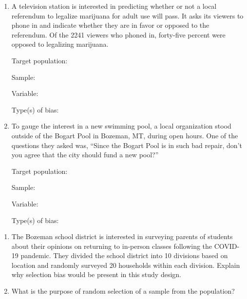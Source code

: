 \documentclass[
]{report}
\begin{document}
\newpage

\begin{enumerate}
\def\labelenumi{\arabic{enumi}.}
\setcounter{enumi}{2}
\item
  A television station is interested in predicting whether or not a local referendum to legalize marijuana for adult use will pass. It asks its viewers to phone in and indicate whether they are in favor or opposed to the referendum. Of the 2241 viewers who phoned in, forty-five percent were opposed to legalizing marijuana.
  \vspace{0.1in}

  Target population:
  \vspace{0.3in}

  Sample:
  \vspace{0.3in}

  Variable:
  \vspace{0.3in}

  Type(s) of bias:
  \vspace{0.3in}
\item
  To gauge the interest in a new swimming pool, a local organization stood outside of the Bogart Pool in Bozeman, MT, during open hours. One of the questions they asked was, ``Since the Bogart Pool is in such bad repair, don't you agree that the city should fund a new pool?''
  \vspace{0.1in}

  Target population:
  \vspace{0.3in}

  Sample:
  \vspace{0.3in}

  Variable:
  \vspace{0.3in}

  Type(s) of bias:
  \vspace{0.3in}
\end{enumerate}

\newpage

\begin{enumerate}
\def\labelenumi{\arabic{enumi}.}
\setcounter{enumi}{4}
\item
  The Bozeman school district is interested in surveying parents of students about their opinions on returning to in-person classes following the COVID-19 pandemic. They divided the school district into 10 divisions based on location and randomly surveyed 20 households within each division. Explain why selection bias would be present in this study design.
  \vspace{1in}
\item
  What is the purpose of random selection of a sample from the population?
\end{enumerate}
\end{document}
